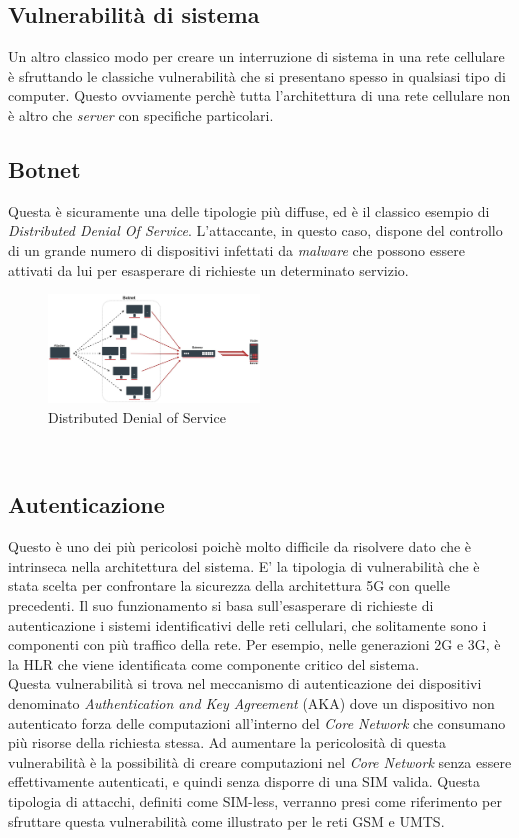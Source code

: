 \subsection{Vulnerabilità di sistema}
Un altro classico modo per creare un interruzione di sistema in una rete cellulare è sfruttando le classiche vulnerabilità che si presentano spesso in qualsiasi tipo di computer.
Questo ovviamente perchè tutta l'architettura di una rete cellulare non è altro che \textit{server} con specifiche particolari.

\subsection{Botnet}
Questa è sicuramente una delle tipologie più diffuse, ed è il classico esempio di \textit{Distributed Denial Of Service}. L'attaccante, in questo caso, dispone del controllo di 
un grande numero di dispositivi infettati da \textit{malware} che possono essere attivati da lui per esasperare di richieste un determinato servizio.
\begin{figure}[h]
    \centering
    \includegraphics[width=0.5\textwidth]{images/ddos.jpg}
    \caption{Distributed Denial of Service}
\end{figure}\\

\subsection{Autenticazione}
Questo è uno dei più pericolosi poichè molto difficile da risolvere dato che è intrinseca nella architettura del sistema.
E' la tipologia di vulnerabilità che è stata scelta per confrontare la sicurezza della architettura 5G con quelle precedenti.
Il suo funzionamento si basa sull'esasperare di richieste di autenticazione i sistemi identificativi delle reti cellulari, che solitamente 
sono i componenti con più traffico della rete. Per esempio, nelle generazioni 2G e 3G, è la HLR che viene identificata come componente critico del
sistema.\\
Questa vulnerabilità si trova nel meccanismo di autenticazione dei dispositivi denominato \textit{Authentication and Key Agreement} (AKA) dove un dispositivo
non autenticato forza delle computazioni all'interno del \textit{Core Network} che consumano più risorse della richiesta stessa\cite{umts-dos}.
Ad aumentare la pericolosità di questa vulnerabilità è la possibilità di creare computazioni nel \textit{Core Network} senza essere effettivamente autenticati, e quindi 
senza disporre di una SIM valida. Questa tipologia di attacchi, definiti come SIM-less, verranno presi come riferimento per sfruttare questa vulnerabilità come illustrato per le 
reti GSM\cite{gsm-dos-simless} e UMTS\cite{umts-dos}.

